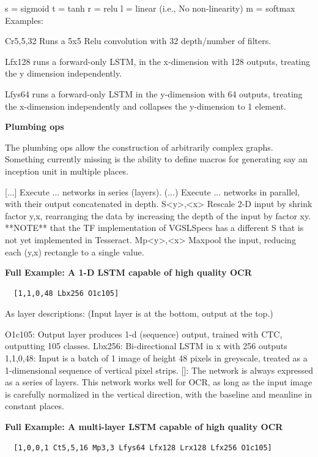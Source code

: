 \documentclass{VUMIFInfBakalaurinis}
\begin{document}
s = sigmoid
t = tanh
r = relu
l = linear (i.e., No non-linearity)
m = softmax
Examples:

Cr5,5,32 Runs a 5x5 Relu convolution with 32 depth/number of filters.

Lfx128 runs a forward-only LSTM, in the x-dimension with 128 outputs, treating the y dimension independently.

Lfys64 runs a forward-only LSTM in the y-dimension with 64 outputs, treating the x-dimension independently and collapses the y-dimension to 1 element.

\textbf{Plumbing ops}

The plumbing ops allow the construction of arbitrarily complex graphs. Something currently missing is the ability to define 
macros for generating say an inception unit in multiple places.

[...] Execute ... networks in series (layers).
(...) Execute ... networks in parallel, with their output concatenated in depth.
S<y>,<x> Rescale 2-D input by shrink factor y,x, rearranging the data by
  increasing the depth of the input by factor xy.
  **NOTE** that the TF implementation of VGSLSpecs has a different S that is
  not yet implemented in Tesseract.
Mp<y>,<x> Maxpool the input, reducing each (y,x) rectangle to a single value.

\textbf{Full Example: A 1-D LSTM capable of high quality OCR}

\begin{verbatim}
  [1,1,0,48 Lbx256 O1c105]
\end{verbatim}

As layer descriptions: (Input layer is at the bottom, output at the top.)

O1c105: Output layer produces 1-d (sequence) output, trained with CTC,
  outputting 105 classes.
Lbx256: Bi-directional LSTM in x with 256 outputs
1,1,0,48: Input is a batch of 1 image of height 48 pixels in greyscale, treated
  as a 1-dimensional sequence of vertical pixel strips.
[]: The network is always expressed as a series of layers.
This network works well for OCR, as long as the input image is carefully normalized in the vertical direction, with the baseline and meanline in constant places.

\textbf{Full Example: A multi-layer LSTM capable of high quality OCR}

\begin{verbatim}
  [1,0,0,1 Ct5,5,16 Mp3,3 Lfys64 Lfx128 Lrx128 Lfx256 O1c105]
\end{verbatim}
\end{document}
